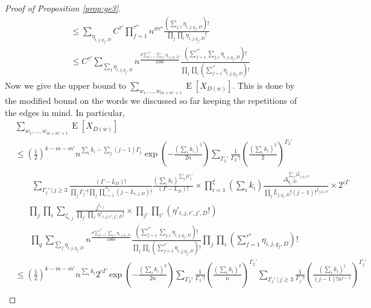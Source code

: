 \documentclass[12pt]{article}
\numberwithin{equation}{section}
\numberwithin{equation}{section}
\theoremstyle{definition}
\DeclareMathOperator{\E}{E} \DeclareMathOperator{\var}{Var}
\renewcommand{\1}{\bf 1}
\begin{document}
\begin{proof}[Proof of Proposition \ref{prop:ge3}]
\begin{equation}
\begin{split}
& \le \sum_{\eta_{i,j,q_{f},D}} C^{\tau'} \prod_{f=1}^{\tau''} n^{\vartheta \tau''} \frac{\left(\sum_{j,i}\eta_{i,j,q_{f},D}\right)!}{\prod_{j}\prod_{i} \eta_{i,j,q_{f},D}!}\\
& \le C^{\tau'} \sum_{\sum_{f}\eta_{i,j,q_{f},D}} n^{\frac{\vartheta \sum_{f=1}^{\tau''}\sum_{j,i}\eta_{i,j,q_{f},D}}{1000}} \frac{\left( \sum_{f=1}^{\tau''} \sum_{j,i} \eta_{i,j,q_{f},D}\right)!}{\prod_{j}\prod_{i} \left( \sum_{f=1}^{\tau'} \eta_{i,j,q_{f},D} \right)!} 
\end{split} 
\end{equation}
Now we give the upper bound to $\sum_{w_{1},\ldots, w_{m+m'+1}}\E\left[ X_{D(w)}  \right]$. This is done by the modified bound on the words we discussed so far keeping the repetitions of the edges in mind. In particular, 
\begin{equation}\label{eq:lastlast}
\begin{split}
&\sum_{w_{1},\ldots , w_{m+m'+1}} \E\left[ X_{D(w)} \right]\\
& \le \left( \frac{1}{2} \right)^{k-m-m'}n^{\sum_{i}k_{i}- \sum_{j}(j-1)\Gamma_{j}}\exp\left( - \frac{\left( \sum_{i} k_{i} \right)^2}{2n} \right)\sum_{\Gamma_{2}'}\frac{1}{\Gamma_{2}'!}\left( \frac{\left( \sum_{i} k_{i} \right)^2}{2} \right)^{\Gamma_{2}'}\\
& ~~~~~~~~~ \sum_{\Gamma_{j}'~|~ j \ge 3}  \frac{\left(\Gamma-L_{D}\right)!}{\prod_{j}\Gamma_{j}'! \prod_{j}\prod_{i=1}^{N_{j}} (j- L_{i,j,D})!}\frac{\left( \sum_{i} k_{i} \right)^{ \sum_{j}j\Gamma_{j}'}}{\left(\Gamma- L_{D}\right)!}\times \prod_{i=1}^{\xi}\left( \sum_{
i}k_{i} \right)\frac{\Delta_{q_{i},D}^{\sum_{j}j\hat{L}_{j,q_{i},D}}}{\prod_{j}\hat{L}_{j,q_{i},D}!(j-1)!^{\hat{L}_{j,q_{i},D}} }\times  2^{c\Gamma} \\
& ~~~~~~~ \prod_{j}\prod_{i}\sum_{\zeta_{i,j}} \frac{j^{\zeta_{i,j}}}{\prod_{j'}\prod_{i'} \eta'_{i,j,i',j',D}!} \times \prod_{j'}\prod_{i'} \left( \eta'_{i,j,i',j',D}! \right)\\
& ~~~~~~~~ \prod_{q}\sum_{\sum_{f}\eta_{i,j,q_{f},D}} n^{\frac{\vartheta \sum_{f=1}^{\tau''}\sum_{j,i}\eta_{i,j,q_{f},D}}{1000}} \frac{\left( \sum_{f=1}^{\tau''} \sum_{j,i} \eta_{i,j,q_{f},D}\right)!}{\prod_{j}\prod_{i} \left( \sum_{f=1}^{\tau'} \eta_{i,j,q_{f},D} \right)!} \prod_{j}\prod_{i}\left( \sum_{f=1}^{\tau''} \eta_{i,j,q_{f},D} \right)!\\
&\le \left( \frac{1}{2} \right)^{k-m-m'}n^{\sum_{i}k_{i}}2^{c\Gamma}\exp\left( - \frac{\left( \sum_{i} k_{i} \right)^2}{2n} \right)\sum_{\Gamma_{2}'}\frac{1}{\Gamma_{2}'!}\left( \frac{\left(\sum_{i}k_{i}\right)^2}{n} \right)^{\Gamma_{2}'}\sum_{\Gamma_{j}' ~|~ j\ge 3} \frac{1}{\Gamma_{j}'!}\left(\frac{\left( \sum_{i} k_{i} \right)^{j}}{(j-1)! n^{j-1}}\right)^{\Gamma_{j}'}\\

\end{split}
\end{equation}
\end{proof}
\end{document}
